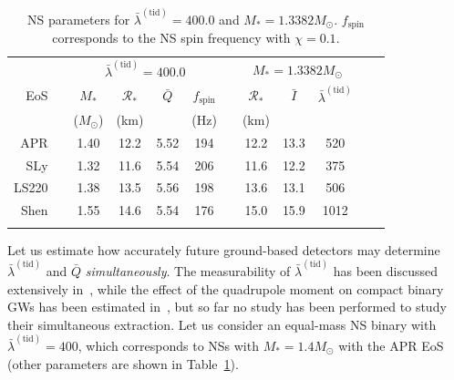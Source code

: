 \documentclass[aps,twocolumn,nofootinbib,showpacs,superscriptaddress,hyperref]{revtex4-1}
\newcommand{\NS}{*}
\newcommand{\RNS}{\mathcal{R}_*}
\newcommand{\tid}{\mathrm{(tid)}}
\newcommand{\mrm}{\mathrm}
\newcommand{\lambdabartid}{\bar{\lambda}^\mathrm{(tid)}}
\newcommand{\Qbar}{\bar{Q}}
\begin{document}
{\renewcommand{\arraystretch}{1.2}
\begin{table}
\begin{centering}
\begin{tabular}{r|cccccc|ccccc}
\hline
\hline
\noalign{\smallskip}
& & \multicolumn{4}{c}{$\bar{\lambda}^\tid=400.0$}  & & \multicolumn{3}{c}{$M_\NS=1.3382M_\odot$}   \\
 EoS &&  \multicolumn{1}{c}{$M_\NS$} &  \multicolumn{1}{c}{$\RNS$}
&  \multicolumn{1}{c}{$\Qbar$}  &   \multicolumn{1}{c}{$f_\mrm{spin}$}  & & \multicolumn{1}{c}{$\RNS$}
&  \multicolumn{1}{c}{$\bar{I}$}  &   \multicolumn{1}{c}{$\bar{\lambda}^\tid$} 
  \\
  & & ($M_\odot$) &  (km) & &  (Hz)  & &  (km) & &  \\
\hline
APR && 1.40  & 12.2 & 5.52 & 194  & &12.2 & 13.3 & 520  \\
 SLy && 1.32  & 11.6 & 5.54 & 206  & & 11.6 & 12.2 & 375 \\
 LS220 && 1.38 & 13.5 & 5.56 & 198  & & 13.6 & 13.1 & 506  \\
 Shen && 1.55 & 14.6 & 5.54 & 176 & & 15.0 & 15.9 & 1012 \\
%
\noalign{\smallskip}
\hline
\hline
\end{tabular}
\end{centering}
\caption{NS parameters for $\bar{\lambda}^\tid=400.0$ and $M_\NS=1.3382M_\odot$. $f_\mrm{spin}$ corresponds to the NS spin frequency with $\chi=0.1$.}
\label{table:parameters}
\end{table}
}
Let us estimate how accurately future ground-based detectors may determine $\lambdabartid$ and $\Qbar$ \emph{simultaneously}.  The measurability of $\bar{\lambda}^\tid$ has been discussed extensively in~\cite{flanagan-hinderer-love,read-love,hinderer-lackey-lang-read,kiuchi,kyutoku,hotokezaka,vines1,vines2,lackey,damour-nagar-villain}, while the effect of the quadrupole moment on compact binary GWs has been estimated in~\cite{bildsten-cutler,lai-rasio-shapiro,poisson-quadrupole}, but so far no study has been performed to study their simultaneous extraction. Let us consider an equal-mass NS binary with $\lambdabartid = 400$, which corresponds to NSs with $M_\NS=1.4M_\odot$ with the APR EoS (other parameters are shown in Table~\ref{table:parameters}).
\end{document}

